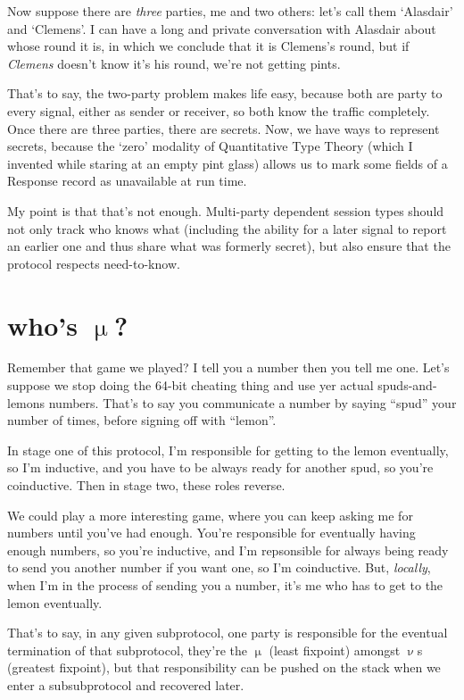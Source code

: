\documentclass{book}
\begin{document}
Now suppose there are \emph{three} parties, me and two others: let's call them `Alasdair' and `Clemens'. I can have a long and private conversation with Alasdair about whose round it is, in which we conclude that it is Clemens's round, but if \emph{Clemens} doesn't know it's his round, we're not getting pints.

That's to say, the two-party problem makes life easy, because both are party to every signal, either as sender or receiver, so both know the traffic completely. Once there are three parties, there are secrets. Now, we have ways to represent secrets, because the `zero' modality of Quantitative Type Theory (which I invented while staring at an empty pint glass) allows us to mark some fields of a Response record as unavailable at run time.

My point is that that's not enough. Multi-party dependent session types should not only track who knows what (including the ability for a later signal to report an earlier one and thus share what was formerly secret), but also ensure that the protocol respects need-to-know.


\section{who's $\upmu$?}

Remember that game we played? I tell you a number then you tell me one. Let's suppose we stop doing the 64-bit cheating thing and use yer actual spuds-and-lemons numbers. That's to say you communicate a number by saying ``spud'' your number of times, before signing off with ``lemon''.

In stage one of this protocol, I'm responsible for getting to the lemon eventually, so I'm inductive, and you have to be always ready for another spud, so you're coinductive. Then in stage two, these roles reverse.

We could play a more interesting game, where you can keep asking me for numbers until you've had enough. You're responsible for eventually having enough numbers, so you're inductive, and I'm repsonsible for always being ready to send you another number if you want one, so I'm coinductive. But, \emph{locally}, when I'm in the process of sending you a number, it's me who has to get to the lemon eventually.

That's to say, in any given subprotocol, one party is responsible for the eventual termination of that subprotocol, they're the $\upmu$ (least fixpoint) amongst $\upnu$s (greatest fixpoint), but that responsibility can be pushed on the stack when we enter a subsubprotocol and recovered later.
\end{document}
